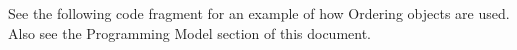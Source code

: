 

See the following code fragment for an example of
how Ordering objects are used.  Also see
the Programming Model section of this document.



